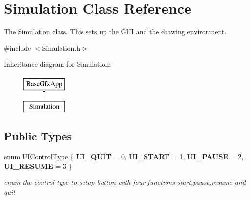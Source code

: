 \hypertarget{classSimulation}{\section{Simulation Class Reference}
\label{classSimulation}
}


The \hyperlink{classSimulation}{Simulation} class. This sets up the G\-U\-I and the drawing environment.  




{\ttfamily \#include $<$Simulation.\-h$>$}

Inheritance diagram for Simulation\-:\begin{figure}[H]
\begin{center}
\leavevmode
\includegraphics[height=2.000000cm]{classSimulation}
\end{center}
\end{figure}
\subsection*{Public Types}
\begin{DoxyCompactItemize}
\item 
enum \hyperlink{classSimulation_a0fd1c91d4e7699e893929d56b60a60bf}{U\-I\-Control\-Type} \{ {\bfseries U\-I\-\_\-\-Q\-U\-I\-T} = 0, 
{\bfseries U\-I\-\_\-\-S\-T\-A\-R\-T} = 1, 
{\bfseries U\-I\-\_\-\-P\-A\-U\-S\-E} = 2, 
{\bfseries U\-I\-\_\-\-R\-E\-S\-U\-M\-E} = 3
 \}
\begin{DoxyCompactList}\small\item\em enum the control type to setup button with four functions start,pause,resume and quit \end{DoxyCompactList}\end{DoxyCompactItemize}
